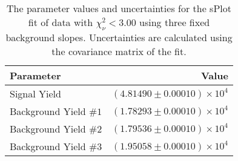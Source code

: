 
\begin{table}[h]
    \begin{center}
        \begin{tabular}{lr}\toprule
            Parameter & Value \\\midrule
            Signal Yield & $(4.81490 \pm 0.00010) \times 10^{4}$ \\
            Background Yield $\#1$ & $(1.78293 \pm 0.00010) \times 10^{4}$ \\
            Background Yield $\#2$ & $(1.79536 \pm 0.00010) \times 10^{4}$ \\
            Background Yield $\#3$ & $(1.95058 \pm 0.00010) \times 10^{4}$ \\\bottomrule
        \end{tabular}
        \caption{The parameter values and uncertainties for the sPlot fit of data with $\chi^2_\nu < 3.00$ using three fixed background slopes. Uncertainties are calculated using the covariance matrix of the fit.}
    \end{center}
\end{table}
